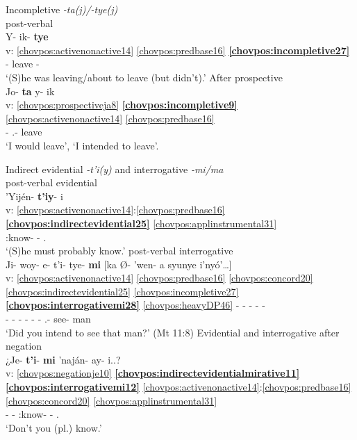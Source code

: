 \documentclass[output=paper]{langscibook}
\begin{document}
\ea Incompletive \textit{-ta(j)/-tye(j)} \\
    \ea\label{bkm:Ref87657836}post-verbal\\ {
    \glll {} Y- ik- \textbf{tye} \\
    v: \ref{chovpos:activenonactive14} \ref{chovpos:predbase16} \textbf{\ref{chovpos:incompletive27}} \\ 
    {} \Third- leave -\Incomp{}\\
    \glt `(S)he was leaving/about to leave (but didn't).'
    }
    \ex\label{bkm:Ref87657851}After prospective { \\ 
    \glll {} Jo- \textbf{ta} y- ik\\ 
    v: \ref{chovpos:prospectiveja8} \textbf{\ref{chovpos:incompletive9}} \ref{chovpos:activenonactive14} \ref{chovpos:predbase16}\\ 
    {} \Prosp{}- \Incomp{} \First.\Irr{}- leave\\
    \glt `I would leave', `I intended to leave'.
    }
    \z
\z 

\ea  Indirect evidential \textit{-t'i(y)} and interrogative \textit{-mi/ma}\\
    \ea\label{bkm:Ref87657861}post-verbal evidential {\\ 
    \glll {} 'Yijén- \textbf{t'iy}{}- i\\ 
   v: \ref{chovpos:activenonactive14}:\ref{chovpos:predbase16} \textbf{\ref{chovpos:indirectevidential25}} \ref{chovpos:applinstrumental31} \\ 
    {} \Third{}:know- \textbf{\Evid{}}- \Ap.\Ins{}\\ 
    \glt `(S)he must probably know.'
    }
    \ex\label{bkm:Ref87657864} post-verbal interrogative\\ { 
    \glll {} Ji- woy- e- t'i- tye- \textbf{mi} [ka Ø{}- 'wen- a syunye i'nyó'…]\\
    v: \ref{chovpos:activenonactive14} \ref{chovpos:predbase16} \ref{chovpos:concord20} \ref{chovpos:indirectevidential25} \ref{chovpos:incompletive27} \textbf{\ref{chovpos:interrogativemi28}} \ref{chovpos:heavyDP46} - - - - -\\ 
    {} \Second{}- \Lv{}- \Second\Pl{}- \Evid{}- \Incomp{}- \textbf{\Inter{}} \Comp{}- \Second.\Irr{}- see- \Second\Pl{} \Dem{} man\\ 
    \glt `Did you intend to see that man?' (Mt 11:8)
    }
    \ex\label{bkm:Ref87657869}Evidential and interrogative after negation \\ 
    \glll {} ¿Je- \textbf{t'i}- \textbf{mi}  'naján- ay- i..? \\
   v: \ref{chovpos:negationje10} \textbf {\ref{chovpos:indirectevidentialmirative11}} \textbf {\ref{chovpos:interrogativemi12}} \ref{chovpos:activenonactive14}:\ref{chovpos:predbase16} \ref{chovpos:concord20} \ref{chovpos:applinstrumental31}\\ 
   {} \Neg{}- \textbf{\Evid{}}- \textbf{\Inter{}} \Second{}:know- \Second\Pl{}- \Ap.\Ins{}\\
    \glt `Don't you (pl.) know.'
     
\end{document}
